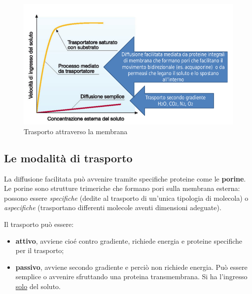 \documentclass[11pt]{book}
\begin{document}
\clearpage
\begin{figure}[htp]
\centering
\includegraphics[scale=0.4]{img/Trasporto attraverso la membrana.png}
\caption{Trasporto attraverso la membrana}
\label{}
\end{figure}


\subsection{Le modalità di trasporto}
La diffusione facilitata può avvenire tramite specifiche proteine come le \textbf{porine}. Le porine sono strutture trimeriche che formano pori sulla membrana esterna: possono essere \emph{specifiche} (dedite al trasporto di un’unica tipologia di molecola) o \emph{aspecifiche} (trasportano differenti molecole aventi dimensioni adeguate).

\vspace{1em}
Il trasporto può essere:
\begin{itemize}
\item \textbf{attivo}, avviene cioé contro gradiente, richiede energia e proteine specifiche per il trasporto;
\item \textbf{passivo}, avviene secondo gradiente e perciò non richiede energia. Può essere semplice o avvenire sfruttando una proteina transmembrana. Si ha l'ingresso \underline{solo} del soluto.
\end{itemize}
\end{document}
